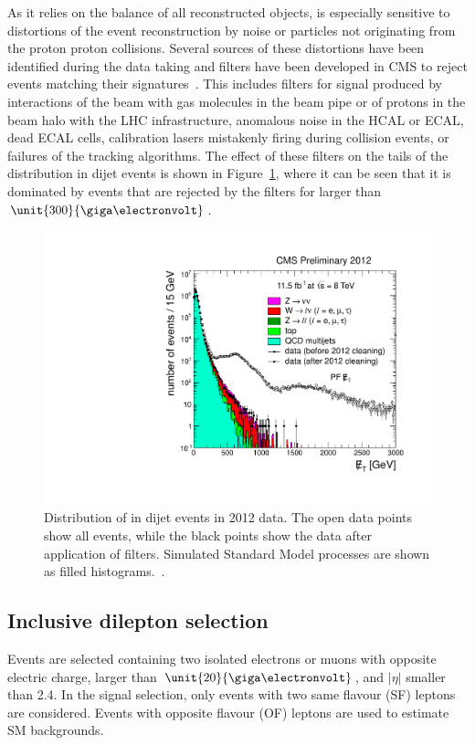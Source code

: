 As it relies on the balance of all reconstructed objects, \MET is especially sensitive to distortions of the event reconstruction by noise or particles not originating from the proton proton collisions. Several sources of these distortions have been identified during the data taking and filters have been developed in CMS to reject events matching their signatures~\cite{CMS-PAS-JME-12-002}. This includes filters for signal produced by interactions of the beam with gas molecules in the beam pipe or of protons in the beam halo with the LHC infrastructure, anomalous noise in the HCAL or ECAL, dead ECAL cells, calibration lasers mistakenly firing during collision events, or failures of the tracking algorithms. The effect of these filters on the tails of the \MET distribution in dijet events is shown in Figure~\ref{fig:METFilters}, where it can be seen that it is dominated by events that are rejected by the filters for \MET larger than $\unit{300}{\giga\electronvolt}$.
\begin{figure}
\begin{center}
\includegraphics[scale=0.4]{plots/SELECTION/metFilter.pdf}
\caption{Distribution of \MET in dijet events in 2012 data. The open data points show all events, while the black points show the data after application of \MET filters. Simulated Standard Model processes are shown as filled histograms.~\cite{CMS-PAS-JME-12-002}.}
\label{fig:METFilters}
\end{center}
\end{figure}


\subsection{Inclusive dilepton selection}
\label{sec:inclusiveSelection}
Events are selected containing two isolated electrons or muons with opposite electric charge, \pt larger than $\unit{20}{\giga\electronvolt}$, and $|\eta|$ smaller than 2.4. In the signal selection, only events with two same flavour (SF) leptons are considered. Events with opposite flavour (OF) leptons are used to estimate SM backgrounds. 

